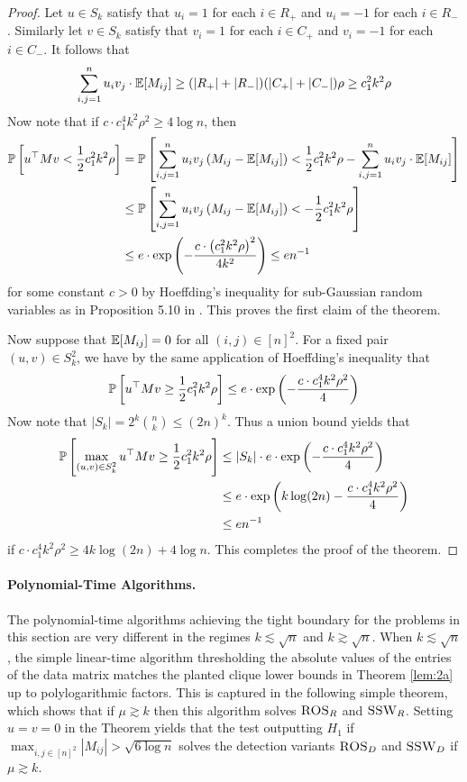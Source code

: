 \begin{proof}
Let $u \in S_k$ satisfy that $u_i = 1$ for each $i \in R_+$ and $u_i = - 1$ for each $i \in R_-$. Similarly let $v \in S_k$ satisfy that $v_i = 1$ for each $i \in C_+$ and $v_i = -1$ for each $i \in C_-$. It follows that
$$\sum_{i, j = 1}^n u_i v_j \cdot \mathbb{E}[M_{ij}] \ge (|R_+| + |R_-|)(|C_+| + |C_-|) \rho \ge c_1^2 k^2 \rho$$
Now note that if $c \cdot c_1^4 k^2\rho^2 \ge 4 \log n$, then
\begin{align*}
\mathbb{P}\left[ u^\top M v < \frac{1}{2} c_1^2 k^2 \rho \right] &= \mathbb{P}\left[ \sum_{i, j = 1}^n u_i v_j \left(M_{ij} - \mathbb{E}[M_{ij}] \right) < \frac{1}{2} c_1^2 k^2 \rho -\sum_{i, j = 1}^n u_i v_j \cdot \mathbb{E}[M_{ij}] \right] \\
&\le \mathbb{P}\left[ \sum_{i, j = 1}^n u_i v_j \left(M_{ij} - \mathbb{E}[M_{ij}] \right) < -\frac{1}{2} c_1^2 k^2 \rho \right] \\
&\le e \cdot \exp\left( - \frac{c \cdot \left( c_1^2 k^2 \rho \right)^2}{4k^2} \right) \le en^{-1}
\end{align*}
for some constant $c > 0$ by Hoeffding's inequality for sub-Gaussian random variables as in Proposition 5.10 in \cite{vershynin2010introduction}. This proves the first claim of the theorem.

Now suppose that $\mathbb{E}[M_{ij}] = 0$ for all $(i, j) \in [n]^2$. For a fixed pair $(u, v) \in S_k^2$, we have by the same application of Hoeffding's inequality that
$$\mathbb{P}\left[ u^\top M v \ge \frac{1}{2} c_1^2 k^2 \rho \right] \le e \cdot \exp\left( - \frac{c \cdot c_1^4 k^2 \rho^2}{4} \right)$$
Now note that $|S_k| = 2^k \binom{n}{k} \le (2n)^k$. Thus a union bound yields that
\begin{align*}
\mathbb{P}\left[ \max_{(u, v) \in S_k^2} u^\top M v \ge \frac{1}{2} c_1^2 k^2 \rho \right] &\le |S_k| \cdot e \cdot \exp\left( - \frac{c \cdot c_1^4 k^2 \rho^2}{4} \right)\\
&\le e \cdot \exp\left( k \log (2n) - \frac{c \cdot c_1^4 k^2 \rho^2}{4} \right)\\
&\le en^{-1}
\end{align*}
if $c \cdot c_1^4 k^2 \rho^2 \ge 4k \log(2n) + 4 \log n$. This completes the proof of the theorem.
\end{proof}

\paragraph{Polynomial-Time Algorithms.} The polynomial-time algorithms achieving the tight boundary for the problems in this section are very different in the regimes $k \lesssim \sqrt{n}$ and $k \gtrsim \sqrt{n}$. When $k \lesssim \sqrt{n}$, the simple linear-time algorithm thresholding the absolute values of the entries of the data matrix matches the planted clique lower bounds in Theorem \ref{lem:2a} up to polylogarithmic factors. This is captured in the following simple theorem, which shows that if $\mu \gtrsim k$ then this algorithm solves $\textsc{ROS}_R$ and $\textsc{SSW}_R$. Setting $u = v = 0$ in the Theorem yields that the test outputting $H_1$ if $\max_{i, j \in [n]^2} |M_{ij}| > \sqrt{6 \log n}$ solves the detection variants $\textsc{ROS}_D$ and $\textsc{SSW}_D$ if $\mu \gtrsim k$.

